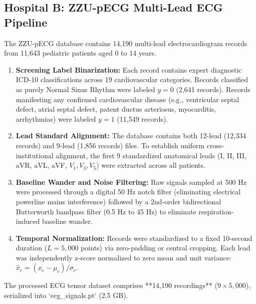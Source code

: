 \documentclass[12pt,a4paper]{amritareport}
\begin{document}
\subsection{Hospital B: ZZU-pECG Multi-Lead ECG Pipeline}
The ZZU-pECG database \cite{zheng2025zzu} contains 14,190 multi-lead electrocardiogram records from 11,643 pediatric patients aged 0 to 14 years.
\begin{enumerate}
	\item \textbf{Screening Label Binarization:} Each record contains expert diagnostic ICD-10 classifications across 19 cardiovascular categories. Records classified as purely Normal Sinus Rhythm were labeled $y = 0$ (2,641 records). Records manifesting any confirmed cardiovascular disease (e.g., ventricular septal defect, atrial septal defect, patent ductus arteriosus, myocarditis, arrhythmias) were labeled $y = 1$ (11,549 records).
	\item \textbf{Lead Standard Alignment:} The database contains both 12-lead (12,334 records) and 9-lead (1,856 records) files. To establish uniform cross-institutional alignment, the first 9 standardized anatomical leads (I, II, III, aVR, aVL, aVF, $V_1, V_3, V_5$) were extracted across all patients.
	\item \textbf{Baseline Wander and Noise Filtering:} Raw signals sampled at 500 Hz were processed through a digital 50 Hz notch filter (eliminating electrical powerline mains interference) followed by a 2nd-order bidirectional Butterworth bandpass filter (0.5 Hz to 45 Hz) to eliminate respiration-induced baseline wander.
	\item \textbf{Temporal Normalization:} Records were standardized to a fixed 10-second duration ($L = 5,000$ points) via zero-padding or central cropping. Each lead was independently z-score normalized to zero mean and unit variance: $\hat{x}_c = (x_c - \mu_c) / \sigma_c$.
\end{enumerate}
The processed ECG tensor dataset comprises **14,190 recordings** ($9 \times 5,000$), serialized into `ecg_signals.pt` (2.5 GB).
\end{document}
